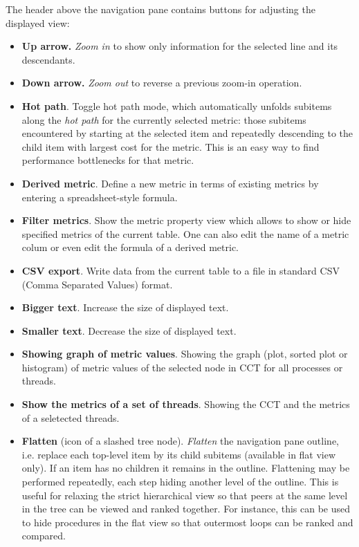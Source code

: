 \documentclass[english]{article}
\begin{document}
\begin{itemize}
The header above the navigation pane contains buttons for adjusting the displayed view:

\begin{itemize}

\item \textbf{Up arrow.} \emph{Zoom in} to show only information for the selected line and its descendants.

\item \textbf{Down arrow.} \emph{Zoom out} to reverse a previous zoom-in operation.

\item \textbf{Hot path}. Toggle hot path mode,
which automatically unfolds subitems along the \emph{hot path} for the currently selected metric:
those subitems encountered by starting at the selected item
and repeatedly descending to the child item with largest cost for the metric.
This is an easy way to find performance bottlenecks for that metric.

\item \textbf{Derived metric}. Define a new metric in terms of existing metrics
by entering a spreadsheet-style formula.

\item \textbf{Filter metrics}. Show the metric property view which allows to show or hide specified metrics of the current table.
One can also edit the name of a metric colum or even edit the formula of a derived metric.

\item \textbf{CSV export}. Write data from the current table to a file
in standard CSV (Comma Separated Values) format.

\item \textbf{Bigger text}. Increase the size of displayed text.

\item \textbf{Smaller text}. Decrease the size of displayed text.

\item \textbf{Showing graph of metric values}.
Showing the graph (plot, sorted plot or histogram) of metric values of the selected node in CCT for all processes or threads.

\item \textbf{Show the metrics of a set of threads}.
Showing the CCT and the metrics of a seletected threads.



\item \textbf{Flatten} (icon of a slashed tree node).
\emph{Flatten} the navigation pane outline,
i.e. replace each top-level item by its child subitems
(available in flat view only).
If an item has no children it remains in the outline.
Flattening may be performed repeatedly, each step hiding another level of the outline.
This is useful for relaxing the strict hierarchical view
so that peers at the same level in the tree can be viewed and ranked together.
For instance, this can be used to hide procedures in the flat view
so that outermost loops can be ranked and compared.


\end{itemize}
\end{itemize}
\end{document}
